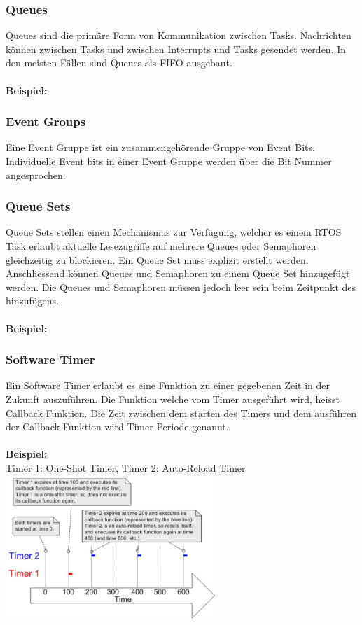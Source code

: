\subsubsection{Queues}
Queues sind die primäre Form von Kommunikation zwischen Tasks. Nachrichten können zwischen Tasks und zwischen Interrupts und Tasks gesendet werden. In den meisten Fällen sind Queues als FIFO ausgebaut. \\ \\
\textbf{Beispiel:}


\subsubsection{Event Groups}
Eine Event Gruppe ist ein zusammengehörende Gruppe von Event Bits. Individuelle Event bits in einer Event Gruppe werden über die Bit Nummer angesprochen.

\subsubsection{Queue Sets}
Queue Sets stellen einen Mechanismus zur Verfügung, welcher es einem RTOS Task erlaubt aktuelle Lesezugriffe auf mehrere Queues oder Semaphoren gleichzeitig zu blockieren. Ein Queue Set muss explizit erstellt werden. Anschliessend können Queues und Semaphoren zu einem Queue Set hinzugefügt werden. Die Queues und Semaphoren müssen jedoch leer sein beim Zeitpunkt des hinzufügens. \\ \\
\textbf{Beispiel:}


\subsubsection{Software Timer}
Ein Software Timer erlaubt es eine Funktion zu einer gegebenen Zeit in der Zukunft auszuführen. Die Funktion welche vom Timer ausgeführt wird, heisst Callback Funktion. Die Zeit zwischen dem starten des Timers und dem ausführen der Callback Funktion wird Timer Periode genannt. \\ \\
\textbf{Beispiel:}\\
Timer 1: One-Shot Timer, Timer 2: Auto-Reload Timer \\
\includegraphics[width=0.6\textwidth]{images/Betriebssysteme/freertos_timer.png}